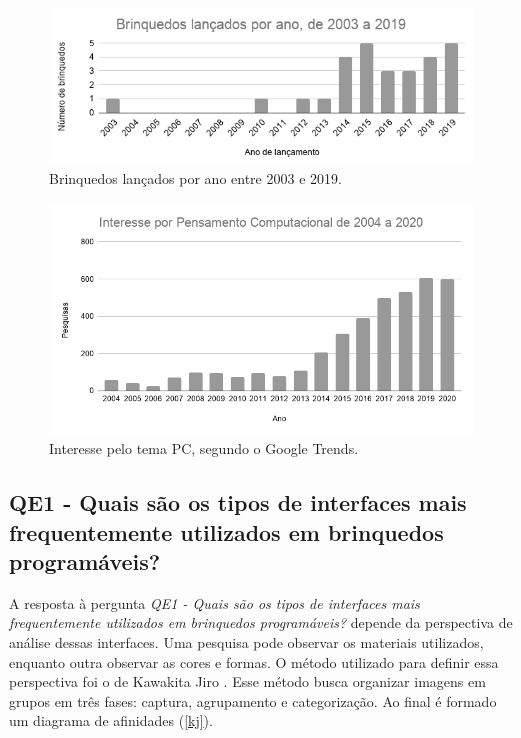 {\begin{figure}[!htbp]
    \centering
    \includegraphics[width=.8\linewidth,fbox]{figs/brinquedos_ano.png}
    \caption{Brinquedos lançados por ano entre 2003 e 2019.}
    \label{toys_year}
    \sourceauthor
\end{figure}

\begin{figure}[!htbp]
    \centering
    \includegraphics[width=.8\linewidth,fbox]{figs/pc_interest.png}
    \caption{Interesse pelo tema \acl{PC}, segundo o Google Trends.}
    \label{pc_interest}
    \sourceauthor
\end{figure}

\subsection{QE1 - Quais são os tipos de interfaces mais frequentemente utilizados em brinquedos programáveis?}

A resposta à pergunta \textit{QE1 - Quais são os tipos de interfaces mais frequentemente utilizados em brinquedos programáveis?} depende da perspectiva de análise dessas interfaces. Uma pesquisa pode observar os materiais utilizados, enquanto outra observar as cores e formas. O método utilizado para definir essa perspectiva foi o de Kawakita Jiro . Esse método busca organizar imagens em grupos em três fases: captura, agrupamento e categorização. Ao final é formado um diagrama de afinidades (\autoref{kj}).

}

